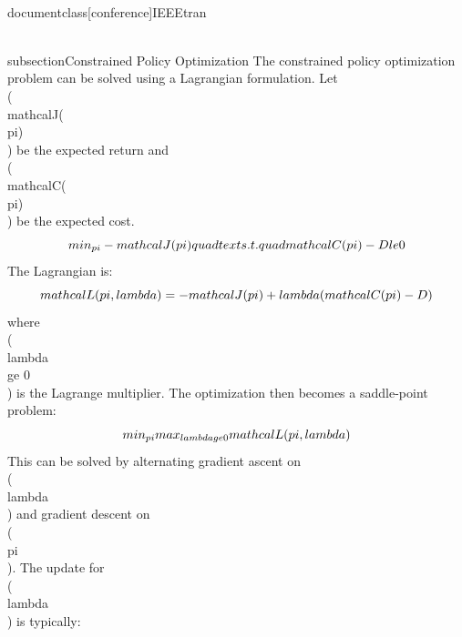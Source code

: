 \\documentclass[conference]{IEEEtran}
\begin{document}
\\subsection{Constrained Policy Optimization}
The constrained policy optimization problem can be solved using a Lagrangian formulation. Let \\(\\mathcal{J}(\\pi)\\) be the expected return and \\(\\mathcal{C}(\\pi)\\) be the expected cost.
$$
\\min_{\\pi} -\\mathcal{J}(\\pi) \\quad \\text{s.t.} \\quad \\mathcal{C}(\\pi) - D \\le 0
$$
The Lagrangian is:
$$
\\mathcal{L}(\\pi, \\lambda) = -\\mathcal{J}(\\pi) + \\lambda (\\mathcal{C}(\\pi) - D)
$$
where \\(\\lambda \\ge 0\\) is the Lagrange multiplier. The optimization then becomes a saddle-point problem:
$$
\\min_{\\pi} \\max_{\\lambda \\ge 0} \\mathcal{L}(\\pi, \\lambda)
$$
This can be solved by alternating gradient ascent on \\(\\lambda\\) and gradient descent on \\(\\pi\\). The update for \\(\\lambda\\) is typically:
\end{document}
